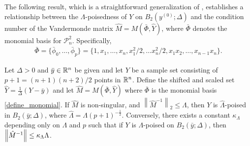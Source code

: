 \documentclass{article}
\begin{document}







The following result, which is a straightforward generalization of  \cite[Theorem 3.14]{introduction_book},  establishes a relationship between the $\Lambda$-poisedness of $Y$ on $B_2(y^{(0)};\Delta)$ and the condition number of the Vandermonde matrix $\hat{M} = M(\bar{\Phi},\hat{Y})$, where $\bar{\Phi}$ denotes the monomial basis for $\mathcal{P}^2_n$.  Specifically,
\begin{align}
\label{define_monomial}
\bar{\Phi} = \{ \bar{\phi}_0, \ldots, \bar{\phi}_p\} =\{1, x_1, \ldots, x_n, x_1^2/2, \ldots x_n^2/2,x_1 x_2, \ldots, x_{n-1}x_{n}\}.
\end{align}




\begin{theorem} \label{scale_the_radius}
\label{Lambda_poised_error_bounds_delta}
Let $\Delta >0$ and $\bar{y} \in \mathbb R^n$ be given and  let $Y$ be a sample set consisting of $p+1=(n+1)(n+2)/2$ points in  $\mathbb R^n$.    Define the shifted and scaled set $\hat{Y} = \frac{1}{\Delta} \left(Y-\bar{y}\right)$ and let $\hat{M}=M(\bar{\Phi},\hat{Y})$ where $\bar{\Phi}$ is the monomial basis \cref{define_monomial}.
If $\hat{M}$ is non-singular, and $\left\|{\hat{M}^{-1}}\right\|_2 \le \Lambda$, then $Y$ is $\hat{\Lambda}$-poised in $B_2(\bar{y};\Delta)$,
where $\hat{\Lambda} = \Lambda \left(p+1\right)^{-\frac 1 2}$.  Conversely,  there exists a constant $\kappa_\Lambda$ depending only on $\Lambda$ and $p$ such that if $Y$ is $\Lambda$-poised on $B_2(\bar{y};\Delta)$, then ${\left\|\hat{M}^{-1}\right\|} \le \kappa_{\Lambda} \Lambda$.
\end{theorem}
\end{document}
